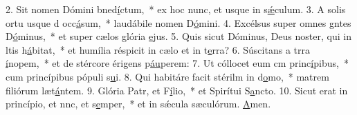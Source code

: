 2. Sit nomen Dómini bned\uline{í}ctum,~* ex hoc nunc, et usque in s\uline{ǽ}culum.
3. A solis ortu usque d occ\uline{á}sum,~* laudábile nomen D\uline{ó}mini.
4. Excélsus super omnes gntes D\uline{ó}minus,~* et super cælos glória \uline{e}jus.
5. Quis sicut Dóminus, Deus noster, qui in ltis h\uline{á}bitat,~* et humília réspicit in cælo et in t\uline{e}rra?
6. Súscitans a trra \uline{í}nopem,~* et de stércore érigens p\uline{áu}perem:
7. Ut cóllocet eum cm princ\uline{í}pibus,~* cum princípibus pópuli s\uline{u}i.
8. Qui habitáre facit stérilm in d\uline{o}mo,~* matrem filiórum læt\uline{á}ntem.
9. Glória Patr, et F\uline{í}lio,~* et Spirítui S\uline{a}ncto.
10. Sicut erat in princípio, et nnc, et s\uline{e}mper,~* et in sǽcula sæculórum. \uline{A}men.
